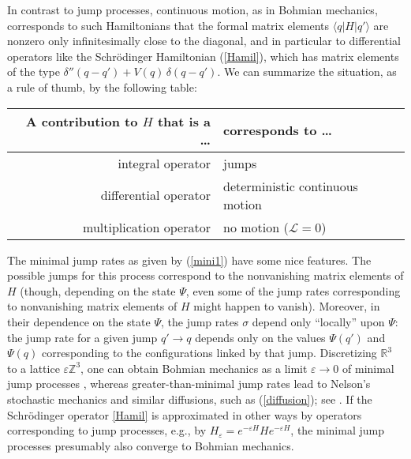 \documentclass[12pt]{article}
\newcommand{\RRR}{\mathbb{R}} %
\newcommand{\ZZZ}{\mathbb{Z}} %
\newcommand{\E}{e} %
\newcommand{\1}{\mathbf{1}} %
\renewcommand{\sp}[2]{\langle #1 | #2 \rangle} %
\newcommand{\generator}{\mathscr{L}} %
\begin{document}
In contrast to jump processes, continuous motion, as in Bohmian
mechanics, corresponds to such Hamiltonians that the formal matrix
elements $\sp{q}{H|q'}$ are nonzero only infinitesimally close to the
diagonal, and in particular to differential operators like the
Schr\"odinger Hamiltonian (\ref{Hamil}), which has matrix elements of
the type $\delta''(q-q') + V(q) \,\delta(q-q')$. We can summarize the
situation, as a rule of thumb, by the following table:

\begin{center}
\begin{tabular}{|r|l|}
   \hline
   A contribution to $H$ that is a \ldots & corresponds to \ldots\\\hline
   integral operator & jumps\\
   differential operator & deterministic continuous motion\\
   multiplication operator & no motion ($\generator = 0$)\\\hline
\end{tabular}
\end{center}

The minimal jump rates as given by (\ref{mini1}) have some nice
features.  The possible jumps for this process correspond to the
nonvanishing matrix elements of $H$ (though, depending on the state
$\Psi$, even some of the jump rates corresponding to nonvanishing
matrix elements of $H$ might happen to vanish).  Moreover, in their
dependence on the state $\Psi$, the jump rates $\sigma$ depend only
``locally'' upon $\Psi$: the jump rate for a given jump $q'\to q$
depends only on the values $\Psi(q')$ and $\Psi(q)$ corresponding to
the configurations linked by that jump.  Discretizing $\RRR^3$ to a
lattice $\varepsilon \ZZZ^3$, one can obtain Bohmian mechanics as a
limit $\varepsilon\to 0$ of minimal jump processes
\cite{Sudbery,Vink}, whereas greater-than-minimal jump rates lead to
Nelson's stochastic mechanics \cite{stochmech} and similar diffusions,
such as (\ref{diffusion}); see \cite{Vink,Guerra}. If the
Schr\"odinger operator \eqref{Hamil} is approximated in other ways by
operators corresponding to jump processes, e.g., by $H_\varepsilon =
\E^{-\varepsilon H} H \E^{-\varepsilon H}$, the minimal jump processes
presumably also converge to Bohmian mechanics.
\end{document}

